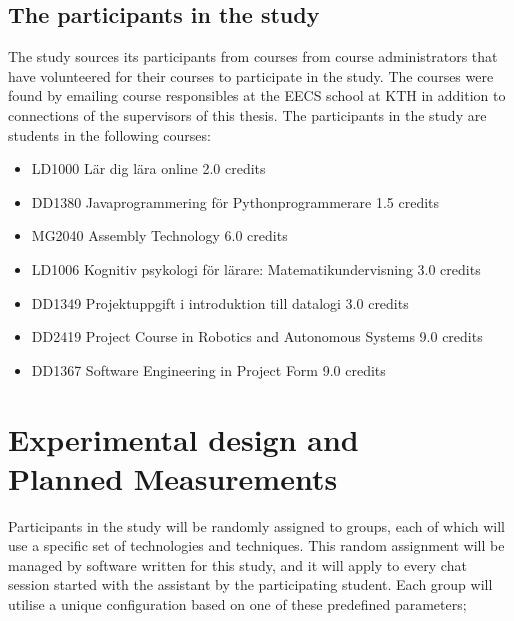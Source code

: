 

\subsection{The participants in the study}


The study sources its participants from courses from course administrators that have volunteered for their courses to participate in the study. The courses were found by emailing course responsibles at the EECS school at KTH in addition to connections of the supervisors of this thesis. The participants in the study are students in the following courses:


\begin{itemize}
        \item LD1000 Lär dig lära online 2.0 credits
        \item DD1380 Javaprogrammering för Pythonprogrammerare 1.5 credits
        \item MG2040 Assembly Technology 6.0 credits
        \item LD1006 Kognitiv psykologi för lärare: Matematikundervisning 3.0 credits
        \item DD1349 Projektuppgift i introduktion till datalogi 3.0 credits
        \item DD2419 Project Course in Robotics and Autonomous Systems 9.0 credits
        \item DD1367 Software Engineering in Project Form 9.0 credits
\end{itemize}


\section[Experimental design/Planned Measurements]{Experimental design and\\Planned Measurements}
\label{sec:experimentalDesign}


Participants in the study will be randomly assigned to groups, each of which will use a specific set of technologies and techniques. This random assignment will be managed by software written for this study, and it will apply to every chat session started with the assistant by the participating student. Each group will utilise a unique configuration based on one of these predefined parameters;


